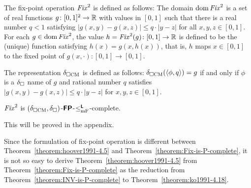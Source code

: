 \documentclass[envcountsame,orivec,oribibl]{llncs}
\begin{document}
The fix-point operation $\mathit{Fix}^2$ is defined as follows:
The domain $\mathop{\rm dom} \mathit{Fix}^2$ is a set of real functions 
$g \colon [0, 1]^2 \to \mathbb R$ with values in $[0, 1]$ 
such that there is a real number $q < 1$
satisfying $|g(x, y) - g(x, z)| \le q \cdot |y - z|$
for all $x, y, z \in [0,1]$.
For each $g \in \mathop{\rm dom} \mathit{Fix}^2$, 
the value $h = \mathit{Fix}^2(g) \colon [0, 1] \to \mathbb R$ is defined to be 
the (unique) function satisfying $h(x) = g(x, h(x))$, that is, 
$h$ maps $x \in [0,1]$ to the fixed point of $g(x, \cdot) \colon [0,1] \to [0,1]$.

The representation $\delta _{\square \mathrm{CM}}$ is defined as follows:
$\delta _{\square \mathrm{CM}}(\langle \phi, q \rangle) = g$ if and only if
$\phi$ is a $\delta _\square$ name of $g$ and rational number $q$ satisfies 
$|g(x, y) - g(x, z)| \le q \cdot |y - z|$ for  $x, y, z \in [0,1]$.

\begin{theorem}
 \label{theorem:Fix-is-P-complete}
 $\mathit{Fix}^2$ is $(\delta _{\square \mathrm{CM}}, \delta _\square)$-$\text{\bfseries \sffamily \upshape FP}$-$\leq _{\mathrm{mF}} ^{\text{\bfseries \sffamily \upshape L}}$-complete. 
\end{theorem}

This will be proved in the appendix. 

Since the formulation of fix-point operation is different between 
Theorem~\ref{theorem:hoover1991-4.5} and Theorem~\ref{theorem:Fix-is-P-complete},
it is not so easy to derive Theorem~\ref{theorem:hoover1991-4.5} from
Theorem~\ref{theorem:Fix-is-P-complete} as the reduction from 
Theorem~\ref{theorem:INV-is-P-complete} to Theorem~\ref{theorem:ko1991-4.18}.
\end{document}
